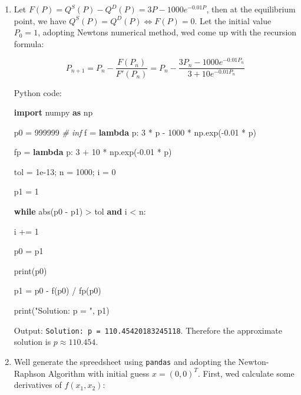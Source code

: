 \documentclass[
]{article}
\newenvironment{Shaded}{}{}
\newcommand{\BuiltInTok}[1]{\textcolor[rgb]{0.00,0.50,0.00}{#1}}
\newcommand{\CommentTok}[1]{\textcolor[rgb]{0.38,0.63,0.69}{\textit{#1}}}
\newcommand{\ControlFlowTok}[1]{\textcolor[rgb]{0.00,0.44,0.13}{\textbf{#1}}}
\newcommand{\DecValTok}[1]{\textcolor[rgb]{0.25,0.63,0.44}{#1}}
\newcommand{\FloatTok}[1]{\textcolor[rgb]{0.25,0.63,0.44}{#1}}
\newcommand{\ImportTok}[1]{\textcolor[rgb]{0.00,0.50,0.00}{\textbf{#1}}}
\newcommand{\KeywordTok}[1]{\textcolor[rgb]{0.00,0.44,0.13}{\textbf{#1}}}
\newcommand{\NormalTok}[1]{#1}
\newcommand{\OperatorTok}[1]{\textcolor[rgb]{0.40,0.40,0.40}{#1}}
\newcommand{\StringTok}[1]{\textcolor[rgb]{0.25,0.44,0.63}{#1}}
\begin{document}
\begin{enumerate}
\def\labelenumi{\arabic{enumi}.}
\item
  Let \(F(P)=Q^S(P)-Q^D(P)=3P-1000e^{-0.01P}\), then at the equilibrium
  point, we have \(Q^S(P)=Q^D(P)\Leftrightarrow F(P)=0\). Let the
  initial value \(P_0=1\), adopting Newton\textquotesingle s numerical
  method, we\textquotesingle d come up with the recursion formula:

  \[P_{n+1}=P_n-\dfrac{F(P_n)}{F'(P_n)}=P_n-\dfrac{3P_n-1000e^{-0.01P_n}}{3+10e^{-0.01P_n}}\]

  Python code:

\begin{Shaded}
\begin{Highlighting}[]
\ImportTok{import}\NormalTok{ numpy }\ImportTok{as}\NormalTok{ np
}


\NormalTok{p0 }\OperatorTok{=} \DecValTok{999999} \CommentTok{\# inf
}
\NormalTok{f }\OperatorTok{=} \KeywordTok{lambda}\NormalTok{ p: }\DecValTok{3} \OperatorTok{*}\NormalTok{ p }\OperatorTok{{-}} \DecValTok{1000} \OperatorTok{*}\NormalTok{ np.exp(}\OperatorTok{{-}}\FloatTok{0.01} \OperatorTok{*}\NormalTok{ p)
}
\NormalTok{fp }\OperatorTok{=} \KeywordTok{lambda}\NormalTok{ p: }\DecValTok{3} \OperatorTok{+} \DecValTok{10} \OperatorTok{*}\NormalTok{ np.exp(}\OperatorTok{{-}}\FloatTok{0.01} \OperatorTok{*}\NormalTok{ p)
}


\NormalTok{tol }\OperatorTok{=} \FloatTok{1e{-}13}\OperatorTok{;}\NormalTok{ n }\OperatorTok{=} \DecValTok{1000}\OperatorTok{;}\NormalTok{ i }\OperatorTok{=} \DecValTok{0}



\NormalTok{p1 }\OperatorTok{=} \DecValTok{1} 

\ControlFlowTok{while} \BuiltInTok{abs}\NormalTok{(p0 }\OperatorTok{{-}}\NormalTok{ p1) }\OperatorTok{\textgreater{}}\NormalTok{ tol }\KeywordTok{and}\NormalTok{ i }\OperatorTok{\textless{}}\NormalTok{ n:
}
\NormalTok{    i }\OperatorTok{+=} \DecValTok{1}

\NormalTok{    p0 }\OperatorTok{=}\NormalTok{ p1
}
    \BuiltInTok{print}\NormalTok{(p0)
}
\NormalTok{    p1 }\OperatorTok{=}\NormalTok{ p0 }\OperatorTok{{-}}\NormalTok{ f(p0) }\OperatorTok{/}\NormalTok{ fp(p0)
}


\BuiltInTok{print}\NormalTok{(}\StringTok{"Solution: p = "}\NormalTok{, p1)}
\end{Highlighting}
\end{Shaded}

  Output: \texttt{Solution:\ p\ =\ 110.45420183245118}. Therefore the
  approximate solution is \(p\approx 110.454\).
\item
  We\textquotesingle ll generate the spreedsheet using \texttt{pandas}
  and adopting the Newton-Raphson Algorithm with initial guess
  \(x=(0,0)^T\). First, we\textquotesingle d calculate some derivatives
  of \(f(x_1,x_2)\):


\end{enumerate}
\end{document}
